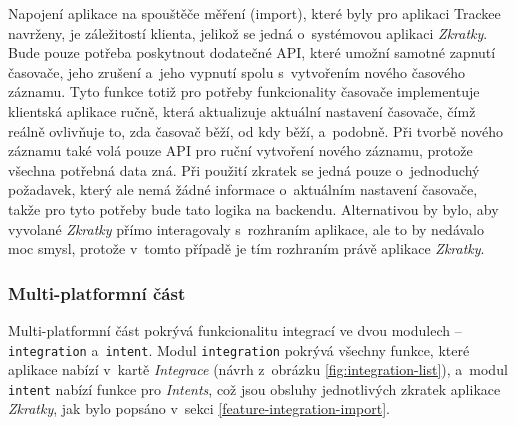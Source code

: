 Napojení aplikace na spouštěče měření (import), které byly pro aplikaci Trackee navrženy, je záležitostí klienta, jelikož se jedná o~systémovou aplikaci \emph{Zkratky}. Bude pouze potřeba poskytnout dodatečné API, které umožní samotné zapnutí časovače, jeho zrušení a~jeho vypnutí spolu s~vytvořením nového časového záznamu. Tyto funkce totiž pro potřeby funkcionality časovače implementuje klientská aplikace ručně, která aktualizuje aktuální nastavení časovače, čímž reálně ovlivňuje to, zda časovač běží, od kdy běží, a~podobně. Při tvorbě nového záznamu také volá pouze API pro ruční vytvoření nového záznamu, protože všechna potřebná data zná. Při použití zkratek se jedná pouze o~jednoduchý požadavek, který ale nemá žádné informace o~aktuálním nastavení časovače, takže pro tyto potřeby bude tato logika na backendu. Alternativou by bylo, aby vyvolané \emph{Zkratky} přímo interagovaly s~rozhraním aplikace, ale to by nedávalo moc smysl, protože v~tomto případě je tím rozhraním právě aplikace \emph{Zkratky}.

\subsubsection{Multi-platformní část}

Multi-platformní část pokrývá funkcionalitu integrací ve dvou modulech – \texttt{integration} a~\texttt{intent}. Modul \texttt{integration} pokrývá všechny funkce, které aplikace nabízí v~kartě \emph{Integrace} (návrh z~obrázku \ref{fig:integration-list}), a~modul \texttt{intent} nabízí funkce pro \emph{Intents}, což jsou obsluhy jednotlivých zkratek aplikace \emph{Zkratky}, jak bylo popsáno v~sekci \ref{feature-integration-import}.

